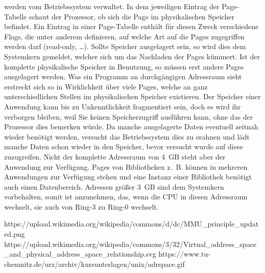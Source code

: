 ﻿\documentclass[12pt]{book}
\begin{document}
werden vom Betriebssystem verwaltet. In dem jeweiligen Eintrag der Page-Tabelle
schaut der Prozessor, ob sich die Page im physikalischen Speicher befindet. Ein
Eintrag in einer Page-Tabelle enthält für diesen Zweck verschiedene Flags, die
unter anderem definieren, auf welche Art auf die Pages zugegriffen werden darf
(read-only, …). Sollte Speicher ausgelagert sein, so wird dies dem Systemkern
gemeldet, welcher sich um das Nachladen der Pages kümmert. Ist der komplette
physikalische Speicher in Benutzung, so müssen erst andere Pages ausgelagert
werden. Was ein Programm an durchgängigen Adressraum sieht erstreckt sich so in
Wirklichkeit über viele Pages, welche an ganz unterschiedlichen Stellen im
physikalischen Speicher existieren. Der Speicher einer Anwendung kann bis zu
Unkenntlichkeit fragmentiert sein, doch es wird ihr verborgen bleiben, weil Sie
keinen Speicherzugriff ausführen kann, ohne das der Prozessor dies bemerken
würde. Da manche ausgelagerte Daten eventuell zeitnah wieder benötigt werden,
versucht das Betriebssystem dies zu erahnen und lädt manche Daten schon wieder
in den Speicher, bevor versucht wurde auf diese zuzugreifen. Nicht der komplette
Adressraum von 4 GB steht aber der Anwendung zur Verfügung. Pages von
Bibliotheken z. B. können in mehreren Anwendungen zur Verfügung stehen und eine
Instanz einer Bibliothek benötigt auch einen Datenbereich. Adressen größer 3 GB
sind dem Systemkern vorbehalten, somit ist anzunehmen, das, wenn die CPU in
diesen Adressraum wechselt, sie auch von Ring-3 zu Ring-0 wechselt.

https://upload.wikimedia.org/wikipedia/commons/d/dc/MMU_principle_updated.png
https://upload.wikimedia.org/wikipedia/commons/3/32/Virtual_address_space_and_physical_address_space_relationship.svg
https://www.tu-chemnitz.de/urz/archiv/kursunterlagen/unix/adrspace.gif
\end{document}
